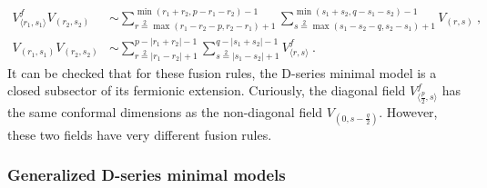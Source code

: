 \documentclass[12pt, a4paper]{article}
\theoremstyle{break}
\begin{document}
\begin{align}
 V^f_{\langle r_1,s_1\rangle}V_{(r_2,s_2)} &\sim \sum_{r\overset{2}{=}\max(r_1-r_2-p,r_2-r_1)+1}^{\min(r_1+r_2,p-r_1-r_2)-1} \sum_{s\overset{2}{=}\max(s_1-s_2-q,s_2-s_1)+1}^{\min(s_1+s_2,q-s_1-s_2)-1} V_{(r,s)} \ ,
 \label{vfvn}
 \\
 V_{(r_1,s_1)} V_{(r_2,s_2)} & \sim \sum_{r\overset{2}{=}|r_1-r_2|+1}^{p-|r_1+r_2|-1} \sum_{s\overset{2}{=}|s_1-s_2|+1}^{q-|s_1+s_2|-1} V^f_{\langle r,s\rangle}\ . 
 \label{vnvn}
\end{align}
It can be checked that for these fusion rules, the D-series minimal model is a closed subsector of its fermionic extension. Curiously, the diagonal field $V^f_{\langle \frac{p}{2}, s\rangle}$ has the same conformal dimensions as the non-diagonal field $V_{(0,s-\frac{q}{2})}$. However, these two fields have very different fusion rules. 

\subsubsection{Generalized D-series minimal models}
\end{document}
